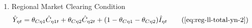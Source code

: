 \documentclass[../thesis.tex]{subfiles}
\begin{document}
{\begin{itemize}
\begin{enumerate}
		\item Regional Market Clearing Condition
		\begin{align}
			\hat{Y}_{\eta t} &= \theta_{C\eta 1} \hat{C}_{\eta 1 t} + \theta_{C\eta 2} \hat{C}_{\eta 2 t} + (1 - \theta_{C\eta 1} - \theta_{C\eta 2}) \hat{I}_{\eta t} \tag{\ref{eq:reg-ll-total-yn-2}}
		\end{align}
		
	\end{enumerate}
	
\end{itemize}

} %

\begin{comment}
	
\newpage

\hrule

\subsection{Extended Log-linear Structure}

\begin{enumerate}
	
	\item Regional Gross Inflation Rate
	\begin{align}
		\hat{\pi}_{1 t} = \hat{P}_{1 t} - \hat{P}_{1, t-1}
	\end{align}
	
	\item Regional Gross Inflation Rate
	\begin{align}
		\hat{\pi}_{2 t} = \hat{P}_{2 t} - \hat{P}_{2, t-1}
	\end{align}
	
	\item New Keynesian Phillips Curve
	\begin{align}
		\hat{\pi}_{1 t} = \beta \E \hat{\pi}_{1, t+1} + \frac{(1-\theta) (1- \theta \beta)}{\theta} \hat{\lambda}_{1 t}
	\end{align}
	
	\item New Keynesian Phillips Curve
	\begin{align}
		\hat{\pi}_{2 t} = \beta \E \hat{\pi}_{2, t+1} + \frac{(1-\theta) (1- \theta \beta)}{\theta} \hat{\lambda}_{2 t}
	\end{align}
	
	\item Law of Motion for Capital
	\begin{alignat}{2}
		\hat{K}_{1, t+1} = (1-\delta) \hat{K}_{1 t} + \delta \hat{I}_{1 t}
	\end{alignat}
	

\end{comment}
\end{document}
